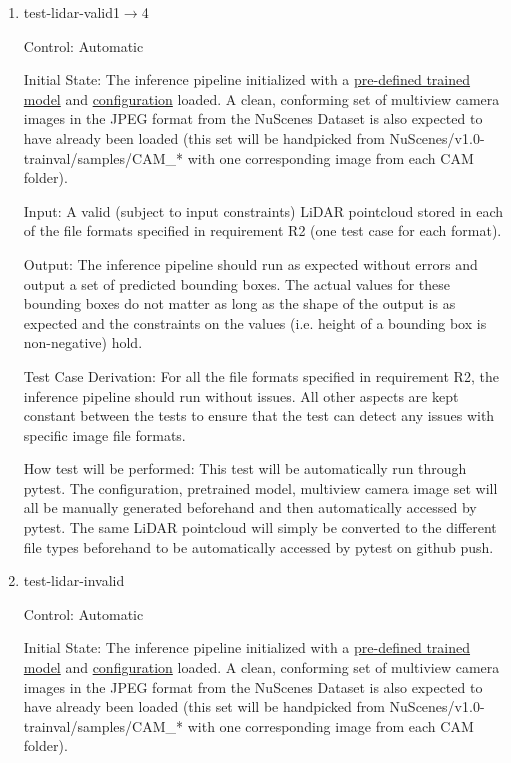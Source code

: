 \documentclass[12pt, titlepage]{article}
\begin{document}
\begin{enumerate}

\item{test-lidar-valid1$\rightarrow$4\\}

Control: Automatic
					
Initial State: The inference pipeline initialized with a \href{https://drive.google.com/file/d/1X50b-8immqlqD8VPAUkSKI0Ls-4k37g9/view}{pre-defined trained model} and \href{https://github.com/open-mmlab/OpenPCDet/blob/master/tools/cfgs/nuscenes_models/bevfusion.yaml}{configuration} loaded. A clean, conforming set of multiview camera images in the JPEG format
from the NuScenes Dataset is also expected to have already been loaded (this set will be handpicked from NuScenes/v1.0-trainval/samples/CAM\_* with one corresponding image from each CAM folder).
					
Input: A valid (subject to input constraints) LiDAR pointcloud stored in each of the file formats specified in requirement R2 (one test case for each format).
					
Output: The inference pipeline should run as expected without errors and output a set of predicted bounding boxes. The actual values for these bounding boxes do not matter as long as the shape of the output is as expected and the constraints on the values (i.e. height of a bounding box is non-negative) hold.

Test Case Derivation: For all the file formats specified in requirement R2, the inference pipeline should run without issues. All other aspects are kept
constant between the tests to ensure that the test can detect any issues with specific image file formats.
					
How test will be performed: This test will be automatically run through pytest. The configuration, pretrained model, multiview camera image set will all be manually generated beforehand
and then automatically accessed by pytest. The same LiDAR pointcloud will simply be converted to the different file types beforehand to be automatically accessed
by pytest on github push.
					
\item{test-lidar-invalid\\}

Control: Automatic
					
Initial State: The inference pipeline initialized with a \href{https://drive.google.com/file/d/1X50b-8immqlqD8VPAUkSKI0Ls-4k37g9/view}{pre-defined trained model} and \href{https://github.com/open-mmlab/OpenPCDet/blob/master/tools/cfgs/nuscenes_models/bevfusion.yaml}{configuration} loaded. A clean, conforming set of multiview camera images in the JPEG format
from the NuScenes Dataset is also expected to have already been loaded (this set will be handpicked from NuScenes/v1.0-trainval/samples/CAM\_* with one corresponding image from each CAM folder).
					

\end{enumerate}
\end{document}

